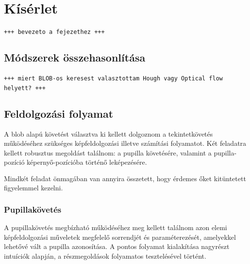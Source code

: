 \chapter{Kísérlet}\label{sect:kiserlet}

\texttt{+++ bevezeto a fejezethez +++}


\section{Módszerek összehasonlítása}\label{sect:modsz_osszehasonlitas}

\texttt{+++ miert BLOB-os keresest valasztottam Hough vagy Optical flow helyett? +++}

\section{Feldolgozási folyamat}\label{sect:feld_folyamat}

A blob alapú követést választva ki kellett dolgoznom a tekintetkövetés működéséhez szükséges képfeldolgozási illetve számítási folyamatot. Két feladatra kellett robusztus megoldást találnom: a pupilla követésére, valamint a pupilla-pozíció képernyő-pozícióba történő leképezésére.

Mindkét feladat önmagában van annyira összetett, hogy érdemes őket kitüntetett figyelemmel kezelni. 

\subsection{Pupillakövetés}\label{sect:pupillakov}

A pupillakövetés megbízható működéséhez meg kellett találnom azon elemi képfeldolgozási műveletek megfelelő sorrendjét és paraméterezését, amelyekkel lehetővé vált a pupilla azonosítása. A pontos folyamat kialakítása nagyrészt intuíciók alapján, a részmegoldások folyamatos tesztelésével történt.

